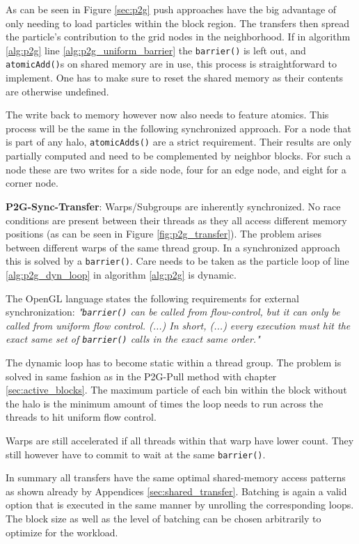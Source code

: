 \documentclass[m,times]{cgMA}
\begin{document}
As can be seen in Figure \ref{sec:p2g} push approaches have the big advantage of only needing to load particles within the block region. The transfers then spread the particle's contribution to the grid nodes in the neighborhood. If in algorithm \ref{alg:p2g} line \ref{alg:p2g_uniform_barrier} the \texttt{barrier()} is left out, and \texttt{atomicAdd()}s on shared memory are in use, this process is straightforward to implement. One has to make sure to reset the shared memory as their contents are otherwise undefined.

The write back to memory however now also needs to feature atomics. This process will be the same in the following synchronized approach. For a node that is part of any halo, \texttt{atomicAdds()} are a strict requirement. Their results are only partially computed and need to be complemented by neighbor blocks. For such a node these are two writes for a side node, four for an edge node, and eight for a corner node.

\textbf{P2G-Sync-Transfer}: Warps/Subgroups are inherently synchronized. No race conditions are present between their threads as they all access different memory positions (as can be seen in Figure \ref{fig:p2g_transfer}). The problem arises between different warps of the same thread group. In a synchronized approach this is solved by a \texttt{barrier()}. Care needs to be taken as the particle loop of line \ref{alg:p2g_dyn_loop} in algorithm \ref{alg:p2g} is dynamic.

The OpenGL language states the following requirements for external synchronization:
\textit{"\texttt{barrier()} can be called from flow-control, but it can only be called from uniform flow control. (...) In short, (...) every execution must hit the exact same set of \texttt{barrier()} calls in the exact same order."} \cite{KHRONOS:BARRIER}

The dynamic loop has to become static within a thread group. The problem is solved in same fashion as in the P2G-Pull method with chapter \ref{sec:active_blocks}. The maximum particle of each bin within the block without the halo is the minimum amount of times the loop needs to run across the threads to hit uniform flow control.

Warps are still accelerated if all threads within that warp have lower count. They still however have to commit to wait at the same \texttt{barrier()}.

In summary all transfers have the same optimal shared-memory access patterns as shown already by Appendices \ref{sec:shared_transfer}. Batching is again a valid option that is executed in the same manner by unrolling the corresponding loops. The block size as well as the level of batching can be chosen arbitrarily to optimize for the workload.
\end{document}
